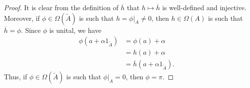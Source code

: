 \documentclass[10pt]{mypackage}
\begin{document}
\begin{proof}
  It is clear from the definition of $\overline{h}$ that $h\mapsto \overline{h}$ is well-defined and injective. Moreover, if $\phi\in \Omega\left(\widetilde{A}\right)$ is such that $h = \phi|_{A}\neq 0$, then $h\in \Omega\left(A\right)$ is such that $\overline{h} = \phi$. Since $\phi$ is unital, we have
  \begin{align*}
    \phi\left(a + \alpha 1_{\widetilde{A}}\right) &= \phi\left(a\right) + \alpha\\
                                                  &= h\left(a\right) + \alpha\\
                                                  &= \overline{h}\left(a + \alpha 1_{\widetilde{A}}\right).
  \end{align*}
  Thus, if $\phi\in \Omega\left(\widetilde{A}\right)$ is such that $\phi|_{A} = 0$, then $\phi = \pi$.
\end{proof}
\end{document}
